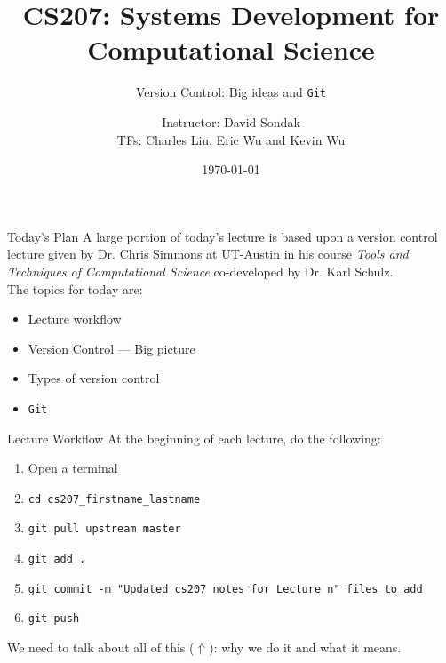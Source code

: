 \documentclass[onlymath, nologo]{beamer}
\author[]{Instructor:  David Sondak \\ TFs:  Charles Liu, Eric Wu and Kevin Wu}
\title{CS207: Systems Development for Computational Science}
\subtitle{Version Control:  Big ideas and \texttt{Git}}
\institute{Harvard University \\ 
           Institute for Applied Computational Science}
\date{\today}
\begin{document}
\bgroup
\makeatletter
{}
\makeatother

  \begin{frame}
    \titlepage
  \end{frame}
  \egroup
  
  \setcounter{framenumber}{0}

  \begin{frame}{Today's Plan}
    A large portion of today's lecture is based upon a version control lecture given by 
    Dr. Chris Simmons at UT-Austin in his course \textit{Tools and Techniques of Computational Science} 
    co-developed by Dr. Karl Schulz. \\[1.0em]
    The topics for today are:
    \begin{itemize}
      \item Lecture workflow
      \item Version Control --- Big picture 
      \item Types of version control 
      \item \texttt{Git}
    \end{itemize}
  \end{frame}

  \begin{frame}{Lecture Workflow}
    At the beginning of each lecture, do the following:
    \begin{enumerate}
      \item Open a terminal 
      \item \texttt{cd cs207\_firstname\_lastname}
      \item \texttt{git pull upstream master} 
      \item \texttt{git add .} 
      \item \texttt{git commit -m "Updated cs207 notes for Lecture n" files\_to\_add}
      \item \texttt{git push}
    \end{enumerate}
    We need to talk about all of this ($\Uparrow$): why we do it and what it means.
  \end{frame}
\end{document}
